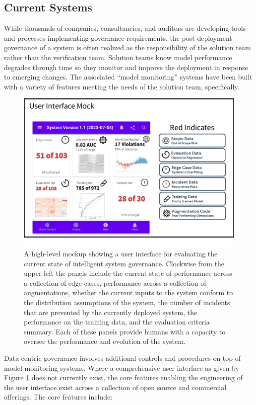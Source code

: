 \subsection{Current Systems}

While thousands of companies, consultancies, and auditors are developing tools and processes implementing governance requirements, the post-deployment governance of a system is often realized as the responsibility of the solution team rather than the verification team. Solution teams know model performance degrades through time so they monitor and improve the deployment in response to emerging changes. The associated ``model monitoring'' systems have been built with a variety of features meeting the needs of the solution team, specifically.

\begin{figure}[ht]
    \centering
    \includegraphics[width=\textwidth]{images/PenpotMock3.png}
    \caption{A high-level mockup showing a user interface for evaluating the current state of intelligent system governance. Clockwise from the upper left the panels include the current state of performance across a collection of edge cases, performance across a collection of augmentations, whether the current inputs to the system conform to the distribution assumptions of the system, the number of incidents that are prevented by the currently deployed system, the performance on the training data, and the evaluation criteria summary. Each of these panels provide humans with a capacity to oversee the performance and evolution of the system.}
    \label{fig:mock}
\end{figure}

Data-centric governance involves additional controls and procedures on top of model monitoring systems. Where a comprehensive user interface as given by Figure \ref{fig:mock} does not currently exist, the core features enabling the engineering of the user interface exist across a collection of open source and commercial offerings. The core features include:

